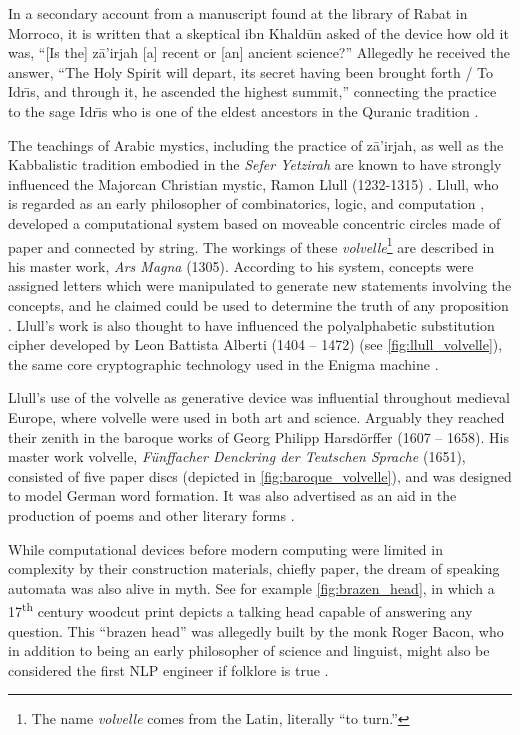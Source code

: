 In a secondary account from a manuscript found at the library of Rabat in
Morroco, it is written that a skeptical ibn Khald\={u}n asked of the device how
old it was, ``[Is the] z\={a}'irjah [a] recent or [an] ancient science?''
Allegedly he received the answer, ``The  Holy  Spirit  will  depart,  its
secret having been brought forth / To Idr\={\i}s, and through it, he ascended
the highest summit,'' connecting the practice to the sage Idr\={\i}s who is one
of the eldest ancestors in the Quranic tradition
\citep{rosenthal1958muqaddimah,link2010variantology}.
  
The teachings of Arabic mystics, including the practice of z\={a}'irjah, as
well as the Kabbalistic tradition embodied in the \textit{Sefer Yetzirah} are
known to have strongly influenced the Majorcan Christian mystic, Ramon Llull
(1232-1315) \citep{kahn1980,link2010variantology,sepllull}.  Llull, who is
regarded as an early philosopher of combinatorics, logic, and computation
\citep{bonner2007art,knuth2013art,sepllull}, developed a computational system
based on moveable concentric circles made of paper and connected by string.
The workings of these \textit{volvelle}\footnote{The name \textit{volvelle}
comes from the Latin, literally ``to turn.''} are described in his master work,
\textit{Ars Magna} (1305). According to his system, concepts were assigned
letters which were manipulated to generate new statements involving the
concepts, and  he claimed could be used to determine the truth of any
proposition \citep{Crupi2019VolvellesOK}. Llull's work is also thought to have
influenced the polyalphabetic substitution cipher developed by Leon Battista
Alberti (1404 -- 1472) (see \autoref{fig:llull_volvelle}), the same core
cryptographic technology used in the Enigma machine  \citep{kahn1980}.



 
 
Llull's use of the volvelle as generative device was influential throughout
medieval Europe, where volvelle were used in both art and science. Arguably
they reached their zenith in the baroque works of Georg Philipp Harsd{\"o}rffer
(1607 -- 1658). His master work volvelle, \textit{F{\"u}nffacher Denckring der
Teutschen Sprache} (1651), consisted of five paper discs (depicted in
\autoref{fig:baroque_volvelle}), and was designed to model German word
formation. It was also advertised as an aid in the production of poems and
other literary  forms \citep{schafer2006literary}.
  
While computational devices before modern computing were limited in complexity
by their construction materials, chiefly paper, the dream of speaking automata
was also alive in myth.  See for example \autoref{fig:brazen_head}, in which a
17\textsuperscript{th} century woodcut print depicts a talking head capable of
answering any question. This ``brazen head'' was allegedly built by the monk
Roger Bacon, who in addition to being an early philosopher of science and
linguist, might also be considered the first NLP engineer if folklore is true
\citep{hyman2016automaton,sep-roger-bacon}.

 
